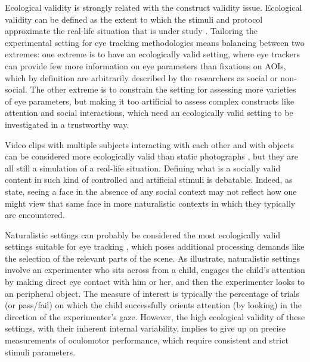 Ecological validity is strongly related with the construct validity issue. Ecological validity can be defined as the extent to which the stimuli and protocol approximate the real-life situation that is under study \citep{boraston2007eyetrackingASD}. Tailoring the experimental setting for eye tracking methodologies means balancing between two extremes: one extreme is to have an ecologically valid setting, where eye trackers can provide few more information on eye parameters than fixations on AOIs, which by definition are arbitrarily described by the researchers as social or non-social. The other extreme is to constrain the setting for assessing more varieties of eye parameters, but making it too artificial to assess complex constructs like attention and social interactions, which need an ecologically valid setting to be investigated in a trustworthy way.

Video clips with multiple subjects interacting with each other and with objects can be considered more ecologically valid than static photographs \citep{boraston2007eyetrackingASD}, but they are all still a simulation of a real-life situation. Defining what is a socially valid content in such kind of controlled and artificial stimuli is debatable. Indeed, as \cite[ p. 185]{bush2015socialattention} state, seeing a face in the absence of any social context may not reflect how one might view that same face in more naturalistic contexts in which they typically are encountered. 

Naturalistic settings can probably be considered the most ecologically valid settings suitable for eye tracking \cite[ p. 185]{bush2015socialattention}, which poses additional processing demands like the selection of the relevant parts of the scene. As \cite{birmingham2017gazeselection} illustrate, naturalistic settings involve an experimenter who sits across from a child, engages the child’s attention by making direct eye contact with him or her, and then the experimenter looks to an peripheral object. The measure of interest is typically the percentage of trials (or pass/fail) on which the child successfully orients attention (by looking) in the direction of the experimenter’s gaze. However, the high ecological validity of these settings, with their inherent internal variability, implies to give up on precise measurements of oculomotor performance, which require consistent and strict stimuli parameters.

